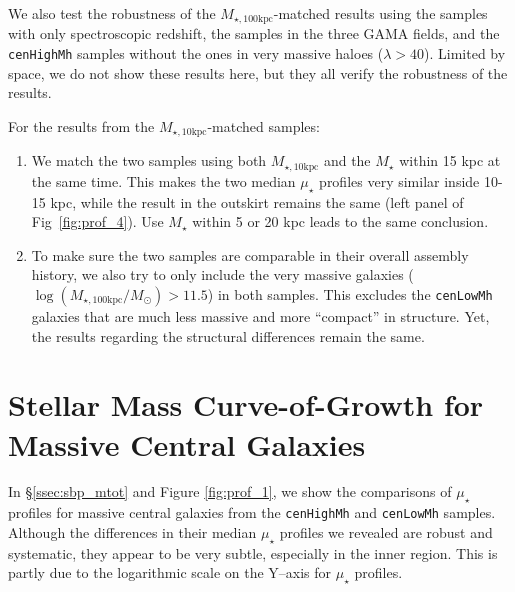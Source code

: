 \documentclass[a4paper,fleqn,usenatbib]{mnras}
\def\rbcg{\texttt{cenHighMh}}
\def\nbcg{\texttt{cenLowMh}}
\def\mstar{{$M_{\star}$}}
\def\minn{{$M_{\star,10\mathrm{kpc}}$}}
\def\mtot{{$M_{\star,100\mathrm{kpc}}$}}
\def\logmtot{{$\log (M_{\star,100\mathrm{kpc}}/M_{\odot})$}}
\def\mden{{$\mu_{\star}$}}
\begin{document}
    We also test the robustness of the \mtot{}-matched results using the samples with 
    only spectroscopic redshift, the samples in the three GAMA fields, and the \rbcg{} 
    samples without the ones in very massive haloes ($\lambda > 40$).  
    Limited by space, we do not show these results here, but they all verify the 
    robustness of the results. 
    
    For the results from the \minn{}-matched samples: 
    
    \begin{enumerate}
    
        \item
            We match the two samples using both \minn{} and the \mstar{} within 15 kpc 
            at the same time.  
            This makes the two median \mden{} profiles very similar inside 10-15 
            kpc, while the result in the outskirt remains the same (left panel of 
            Fig~\ref{fig:prof_4}).
            Use \mstar{} within 5 or 20 kpc leads to the same conclusion. 
          
        \item 
            To make sure the two samples are comparable in their overall assembly history,
            we also try to only include the very massive galaxies (\logmtot{}$>11.5$)
            in both samples. 
            This excludes the \nbcg{} galaxies that are much less massive and 
            more ``compact'' in structure. 
            Yet, the results regarding the structural differences remain the same. 
          
    \end{enumerate}

\section{Stellar Mass Curve-of-Growth for Massive Central Galaxies} 
	\label{app:cog}
	
	In \S \ref{ssec:sbp_mtot} and Figure \ref{fig:prof_1}, we show the comparisons 
	of \mden{} profiles for massive central galaxies from the \rbcg{} and \nbcg{} 
	samples. 
	Although the differences in their median \mden{} profiles we revealed are robust 
	and systematic, they appear to be very subtle, especially in the inner region. 
	This is partly due to the logarithmic scale on the Y--axis for \mden{} profiles. 
	
\end{document}
